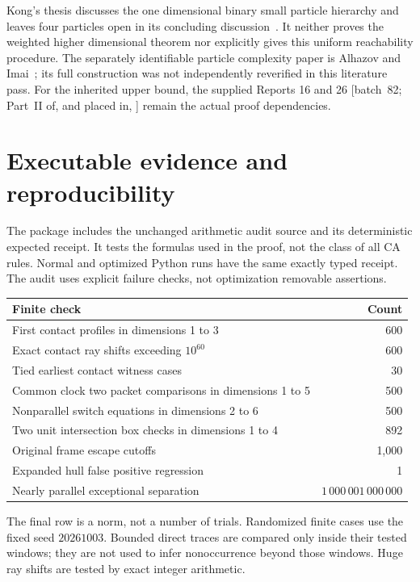 \documentclass[11pt,letterpaper]{article}
\numberwithin{equation}{section}
\theoremstyle{definition}
\theoremstyle{remark}
\begin{document}
Kong's thesis discusses the one dimensional binary small particle hierarchy and leaves four particles open in its concluding discussion~\cite{kongthesis}. It neither proves the weighted higher dimensional theorem nor explicitly gives this uniform reachability procedure. The separately identifiable particle complexity paper is Alhazov and Imai~\cite{alhazovimai}; its full construction was not independently reverified in this literature pass. For the inherited upper bound, the supplied Reports 16 and 26 \textup{[batch~82; Part~II of, and placed in, ]} remain the actual proof dependencies.

\section{Executable evidence and reproducibility}\label{smc:zd:sec:repro}
The package includes the unchanged arithmetic audit source and its deterministic expected receipt. It tests the formulas used in the proof, not the class of all CA rules. Normal and optimized Python runs have the same exactly typed receipt. The audit uses explicit failure checks, not optimization removable assertions.

\begin{center}
\begin{tabular}{p{.64\linewidth}r}
\toprule
Finite check & Count \\
\midrule
First contact profiles in dimensions 1 to 3 & 600 \\
Exact contact ray shifts exceeding $10^{60}$ & 600 \\
Tied earliest contact witness cases & 30 \\
Common clock two packet comparisons in dimensions 1 to 5 & 500 \\
Nonparallel switch equations in dimensions 2 to 6 & 500 \\
Two unit intersection box checks in dimensions 1 to 4 & 892 \\
Original frame escape cutoffs & 1,000 \\
Expanded hull false positive regression & 1 \\
Nearly parallel exceptional separation & $1\,000\,001\,000\,000$ \\
\bottomrule
\end{tabular}
\end{center}
The final row is a norm, not a number of trials. Randomized finite cases use the fixed seed $20261003$. Bounded direct traces are compared only inside their tested windows; they are not used to infer nonoccurrence beyond those windows. Huge ray shifts are tested by exact integer arithmetic.
\end{document}
